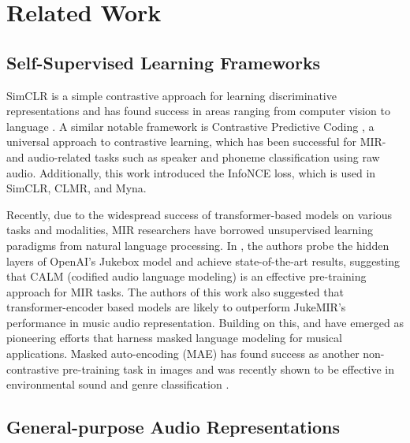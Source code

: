 \section{Related Work}

\subsection{Self-Supervised Learning Frameworks}

SimCLR \cite{SimCLR} is a simple contrastive approach for learning discriminative representations and has found success in areas ranging from computer vision to language \cite{CLMR, SimCSE}. A similar notable framework is Contrastive Predictive Coding \cite{CPC}, a universal approach to contrastive learning, which has been successful for MIR- and audio-related tasks such as speaker and phoneme classification using raw audio. Additionally, this work introduced the InfoNCE loss, which is used in SimCLR, CLMR, and Myna.

Recently, due to the widespread success of transformer-based models on various tasks and modalities, MIR researchers have borrowed unsupervised learning paradigms from natural language processing. In \cite{JukeMIR}, the authors probe the hidden layers of OpenAI's Jukebox model \cite{Jukebox} and achieve state-of-the-art results, suggesting that CALM (codified audio language modeling) is an effective pre-training approach for MIR tasks. The authors of this work also suggested that transformer-encoder based models are likely to outperform JukeMIR's performance in music audio representation. Building on this, \cite{MERT} and \cite{MusicFM} have emerged as pioneering efforts that harness masked language modeling for musical applications. Masked auto-encoding (MAE) has found success as another non-contrastive pre-training task in images and was recently shown to be effective in environmental sound and genre classification \cite{MAE, msemae, m2d}. 

\subsection{General-purpose Audio Representations}

